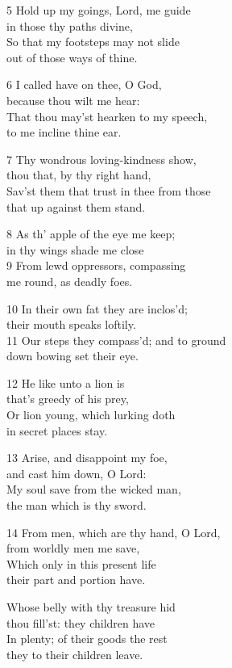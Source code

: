 \begin{multicols}{3}
5 Hold up my goings, Lord, me guide\\
in those thy paths divine,\\
So that my footsteps may not slide\\
out of those ways of thine.

6 I called have on thee, O God,\\
because thou wilt me hear:\\
That thou may’st hearken to my speech,\\
to me incline thine ear.

7 Thy wondrous loving-kindness show,\\
thou that, by thy right hand,\\
Sav’st them that trust in thee from those\\
that up against them stand.

8 As th’ apple of the eye me keep;\\
in thy wings shade me close\\
9 From lewd oppressors, compassing\\
me round, as deadly foes.

10 In their own fat they are inclos’d;\\
their mouth speaks loftily.\\
11 Our steps they compass’d; and to ground\\
down bowing set their eye.

12 He like unto a lion is\\
that’s greedy of his prey,\\
Or lion young, which lurking doth\\
in secret places stay.

13 Arise, and disappoint my foe,\\
and cast him down, O Lord:\\
My soul save from the wicked man,\\
the man which is thy sword.

14 From men, which are thy hand, O Lord,\\
from worldly men me save,\\
Which only in this present life\\
their part and portion have.

Whose belly with thy treasure hid\\
thou fill’st: they children have\\
In plenty; of their goods the rest\\
they to their children leave.


\end{multicols}
